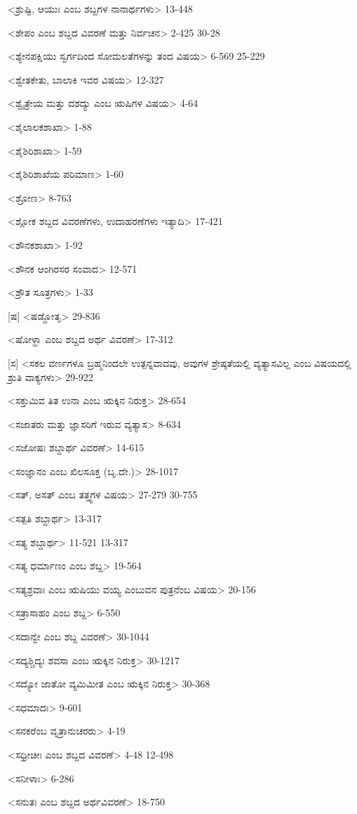 <ಶ್ರುಷ್ಟಿ, ಆಯುಃ ಎಂಬ ಶಬ್ದಗಳ ನಾನಾರ್ಥಗಳು>
13-448

<ಶೇಪಂ ಎಂಬ ಶಬ್ದದ ವಿವರಣೆ ಮತ್ತು ನಿರ್ವಚನ>
2-425
30-28

<ಶ್ಯೇನಪಕ್ಷಿಯು ಸ್ವರ್ಗದಿಂದ ಸೋಮಲತೆಗಳನ್ನು ತಂದ ವಿಷಯ>
6-569
25-229

<ಶ್ವೇತಕೇತು, ಬಾಲಾಕಿ ಇವರ ವಿಷಯ>
12-327

<ಶ್ವೈತ್ರೇಯ ಮತ್ತು ದಶದ್ಯು ಎಂಬ ಋಷಿಗಳ ವಿಷಯ>
4-64

<ಶೈಲಾಲಕಶಾಖಾ>
1-88

<ಶೈಶಿರಿಶಾಖಾ>
1-59

<ಶೈಶಿರಿಶಾಖೆಯ ಪರಿಮಾಣ>
1-60

<ಶ್ರೋಣ>
8-763

<ಶ್ಲೋಕ ಶಬ್ದದ ವಿವರಣೆಗಳು, ಉದಾಹರಣೆಗಳು ಇತ್ಯಾದಿ>
17-421

<ಶೌನಕಶಾಖಾ>
1-92

<ಶೌನಕ ಆಂಗಿರಸರ ಸಂವಾದ>
12-571

<ಶ್ರೌತ ಸೂತ್ರಗಳು>
1-33

[ಷ]
<ಷಡ್ಢೋತೃ>
29-836

<ಷೋಳ್ಹಾ ಎಂಬ ಶಬ್ದದ ಅರ್ಥ ವಿವರಣೆ>
17-312

[ಸ]
<ಸಕಲ ವರ್ಣಗಳೂ ಬ್ರಹ್ಮನಿಂದಲೇ ಉತ್ಪನ್ನವಾದವು, ಅವುಗಳ ಶ್ರೇಷ್ಠತೆಯಲ್ಲಿ ವ್ಯತ್ಯಾಸವಿಲ್ಲ ಎಂಬ ವಿಷಯದಲ್ಲಿ ಶ್ರುತಿ ವಾಕ್ಯಗಳು>
29-922

<ಸಕ್ತುಮಿವ ತಿತ ಉನಾ ಎಂಬ ಋಕ್ಕಿನ ನಿರುಕ್ತ>
28-654

<ಸಜಾತರು ಮತ್ತು ಜ್ಞಾಸರಿಗೆ ಇರುವ ವ್ಯತ್ಯಾಸ>
8-634

<ಸಜೋಷಃ ಶಬ್ದಾರ್ಥ ವಿವರಣೆ>
14-615

<ಸಂಜ್ಞಾನಂ ಎಂಬ ಖಿಲಸೂಕ್ತ (ಬೃ.ದೇ.)>
28-1017

<ಸತ್‍, ಅಸತ್‍ ಎಂಬ ತತ್ತ್ವಗಳ ವಿಷಯ>
27-279
30-755

<ಸತ್ಪತಿ ಶಬ್ದಾರ್ಥ>
13-317

<ಸತ್ಯ ಶಬ್ದಾರ್ಥ>
11-521
13-317

<ಸತ್ಯ ಧರ್ಮಾಣಂ ಎಂಬ ಶಬ್ದ>
19-564

<ಸತ್ಯಶ್ರವಾಃ ಎಂಬ ಋಷಿಯು ವಯ್ಯ ಎಂಬುವನ ಪುತ್ರನೆಂಬ ವಿಷಯ>
20-156

<ಸತ್ರಾಸಾಹಂ ಎಂಬ ಶಬ್ದ>
6-550

<ಸದಾನ್ವೇ ಎಂಬ ಶಬ್ದ ವಿವರಣೆ>
30-1044

<ಸದ್ಯಶ್ಚಿದ್ಯಃ ಶವಸಾ ಎಂಬ ಋಕ್ಕಿನ ನಿರುಕ್ತ>
30-1217

<ಸದ್ಯೋ ಜಾತೋ ವ್ಯಮಿಮೀತ ಎಂಬ ಋಕ್ಕಿನ ನಿರುಕ್ತ>
30-368

<ಸಧಮಾದಃ>
9-601

<ಸನಕರೆಂಬ ವೃತ್ರಾನುಚರರು>
4-19

<ಸಧ್ರೀಚೀಃ ಎಂಬ ಶಬ್ದದ ವಿವರಣೆ>
4-48 
12-498

<ಸನೀಳಾಃ>
6-286

<ಸನುತಃ ಎಂಬ ಶಬ್ದದ ಅರ್ಥವಿವರಣೆ>
18-750

